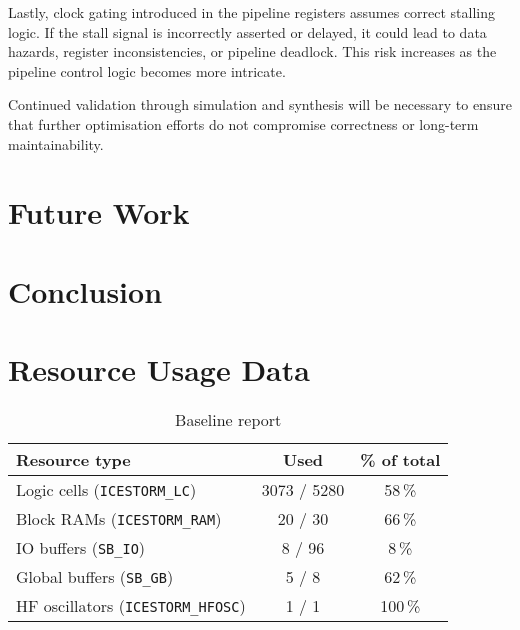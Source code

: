 \documentclass[a4paper,10pt]{article}
\begin{document}
Lastly, clock gating introduced in the pipeline registers assumes 
correct stalling logic. If the stall signal is incorrectly asserted or delayed, 
it could lead to data hazards, register inconsistencies, or pipeline deadlock. 
This risk increases as the pipeline control logic becomes more intricate.

Continued validation through simulation and synthesis will be necessary 
to ensure that further optimisation efforts do not compromise correctness 
or long-term maintainability.

\section{Future Work}
\label{sec:Future_Work}

\section{Conclusion}
\label{sec:Conclusion}

\newpage
\appendix
\section{Resource Usage Data}

\begin{table}[H] 
    \centering
    \begin{tabularx}{0.6\textwidth}{X c c}
        \toprule
        Resource type & Used & \% of total \\ \midrule
        Logic cells (\texttt{ICESTORM\_LC}) & 3073 / 5280 & 58\,\% \\
        Block RAMs (\texttt{ICESTORM\_RAM}) & 20 / 30 & 66\,\% \\
        IO buffers (\texttt{SB\_IO}) & 8 / 96 & 8\,\% \\
        Global buffers (\texttt{SB\_GB}) & 5 / 8 & 62\,\% \\
        HF oscillators (\texttt{ICESTORM\_HFOSC}) & 1 / 1 & 100\,\% \\
        \bottomrule
    \end{tabularx}
    \caption{Baseline report}
    \label{tab:baseline}
\end{table}
\end{document}

